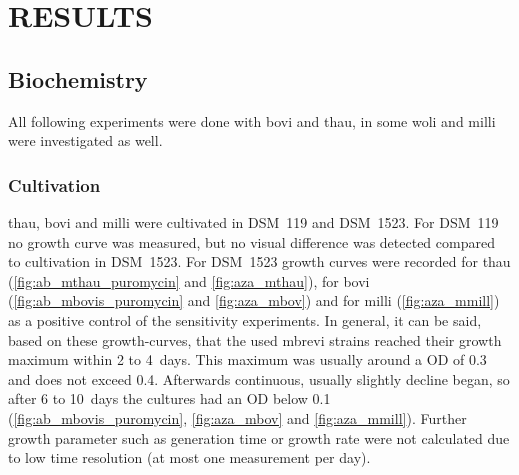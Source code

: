 \section{RESULTS}






\subsection{Biochemistry}

All following experiments were done with \acrlong{bovi} and \acrlong{thau}, in some \acrlong{woli} and \acrlong{milli} were investigated as well. 


\subsubsection{Cultivation}

\acrshort{thau}, \acrshort{bovi} and \acrshort{milli} were cultivated in DSM~119 and DSM~1523. For DSM~119 no growth curve was measured, but no visual difference was detected compared to cultivation in DSM~1523. For DSM~1523 growth curves were recorded for \acrshort{thau} (\cref{fig:ab_mthau_puromycin} and \ref{fig:aza_mthau}), for \acrshort{bovi} (\cref{fig:ab_mbovis_puromycin} and \ref{fig:aza_mbov}) and for \acrshort{milli} (\cref{fig:aza_mmill}) as a positive control of the sensitivity experiments. In general, it can be said, based on these growth-curves, that the used \acrlong{mbrevi} strains reached their growth maximum within 2 to 4~days. This maximum was usually around a \acrfull{OD} of 0.3 and does not exceed 0.4. Afterwards continuous, usually slightly decline began, so after 6 to 10~days the cultures had an \acrshort{OD} below 0.1 (\cref{fig:ab_mbovis_puromycin}, \ref{fig:aza_mbov} and \cref{fig:aza_mmill}). Further growth parameter such as generation time or growth rate were not calculated due to low time resolution (at most one measurement per day).

